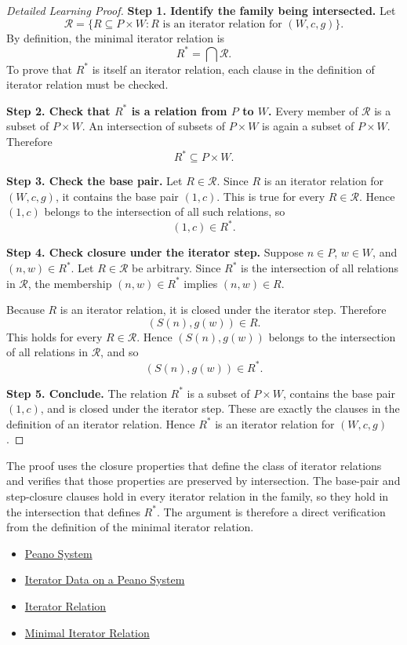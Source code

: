 \begin{proof}[Detailed Learning Proof]
\LRAProofBodyStart

\textbf{Step 1. Identify the family being intersected.}
Let
\[
\mathcal R=
\{R\subseteq P\times W : R \text{ is an iterator relation for } (W,c,g)\}.
\]
By definition, the minimal iterator relation is
\[
R^*=\bigcap \mathcal R.
\]
To prove that $R^*$ is itself an iterator relation, each clause in the
definition of iterator relation must be checked.

\textbf{Step 2. Check that $R^*$ is a relation from $P$ to $W$.}
Every member of $\mathcal R$ is a subset of $P\times W$. An intersection of
subsets of $P\times W$ is again a subset of $P\times W$. Therefore
\[
R^*\subseteq P\times W.
\]

\textbf{Step 3. Check the base pair.}
Let $R\in\mathcal R$. Since $R$ is an iterator relation for $(W,c,g)$, it
contains the base pair $(1,c)$. This is true for every $R\in\mathcal R$.
Hence $(1,c)$ belongs to the intersection of all such relations, so
\[
(1,c)\in R^*.
\]

\textbf{Step 4. Check closure under the iterator step.}
Suppose $n\in P$, $w\in W$, and $(n,w)\in R^*$. Let $R\in\mathcal R$ be
arbitrary. Since $R^*$ is the intersection of all relations in $\mathcal R$,
the membership $(n,w)\in R^*$ implies $(n,w)\in R$.

Because $R$ is an iterator relation, it is closed under the iterator step.
Therefore
\[
(S(n),g(w))\in R.
\]
This holds for every $R\in\mathcal R$. Hence $(S(n),g(w))$ belongs to the
intersection of all relations in $\mathcal R$, and so
\[
(S(n),g(w))\in R^*.
\]

\textbf{Step 5. Conclude.}
The relation $R^*$ is a subset of $P\times W$, contains the base pair
$(1,c)$, and is closed under the iterator step. These are exactly the clauses
in the definition of an iterator relation. Hence $R^*$ is an iterator relation
for $(W,c,g)$.
\end{proof}

\begin{remark*}
The proof uses the closure properties that define the class of iterator
relations and verifies that those properties are preserved by intersection.
The base-pair and step-closure clauses hold in every iterator relation in the
family, so they hold in the intersection that defines $R^*$. The argument is
therefore a direct verification from the definition of the minimal iterator
relation.
\end{remark*}

\begin{dependencies}
\begin{itemize}
  \item \hyperref[def:peano-system]{Peano System}
  \item \hyperref[def:iterator-data-on-peano-system]{Iterator Data on a Peano System}
  \item \hyperref[def:iterator-relation]{Iterator Relation}
  \item \hyperref[def:minimal-iterator-relation]{Minimal Iterator Relation}
\end{itemize}
\end{dependencies}

\clearpage
